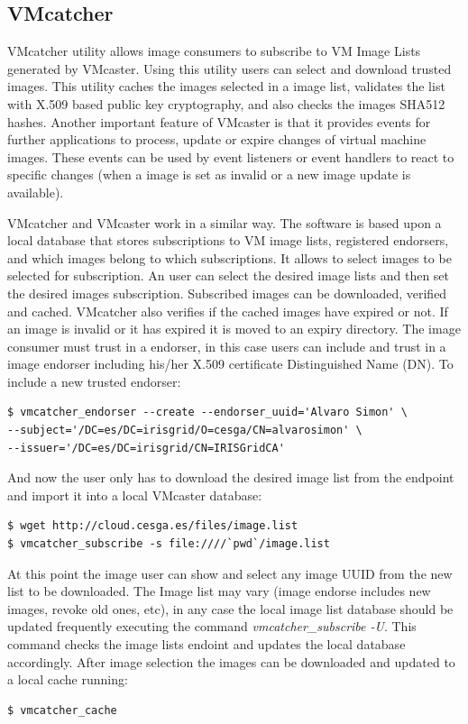 \documentclass[oribibl]{llncs_Ibergrid2013}
\begin{document}
\subsection{VMcatcher}
VMcatcher utility allows image consumers to subscribe to VM Image Lists generated by VMcaster. 
Using this utility users can select and download trusted images.
This utility caches the images selected in a image list, validates the list with X.509 based public key cryptography, and also checks  the images SHA512 hashes. 
Another important feature of VMcaster is that it provides events for further applications to process, update or expire changes of virtual machine images. 
These events can be used by event listeners or event handlers to react to specific changes (when a image is set as invalid or a new image update is available). 

VMcatcher and VMcaster work in a similar way. The software is based upon a local database that stores subscriptions to VM image lists, registered endorsers, and which images belong to which subscriptions. 
It allows to select images to be selected for subscription. An user can select the desired image lists and then set the desired images subscription.
Subscribed images can be downloaded, verified and cached. VMcatcher also verifies if the cached images have expired or not. If an image is invalid or it has expired it is moved to an expiry directory.
The image consumer must trust in a endorser, in this case users can include and trust in a image endorser including his/her X.509 certificate Distinguished Name (DN).
To include a new trusted endorser:
\begin{verbatim}
$ vmcatcher_endorser --create --endorser_uuid='Alvaro Simon' \
--subject='/DC=es/DC=irisgrid/O=cesga/CN=alvarosimon' \
--issuer='/DC=es/DC=irisgrid/CN=IRISGridCA'
\end{verbatim}
And now the user only has to download the desired image list from the endpoint and import it into a local VMcaster database:
\begin{verbatim}
$ wget http://cloud.cesga.es/files/image.list
$ vmcatcher_subscribe -s file:////`pwd`/image.list
\end{verbatim}
At this point the image user can show and select any image UUID from the new list to be downloaded. 
The Image list may vary (image endorse includes new images, revoke old ones, etc), in any case the local image list database should be updated frequently executing the command \textit{vmcatcher\_subscribe -U}.
This command checks the image lists endoint and updates the local database accordingly.
After image selection the images can be downloaded and updated to a local cache running:
\begin{verbatim}
$ vmcatcher_cache
\end{verbatim}
\end{document}

